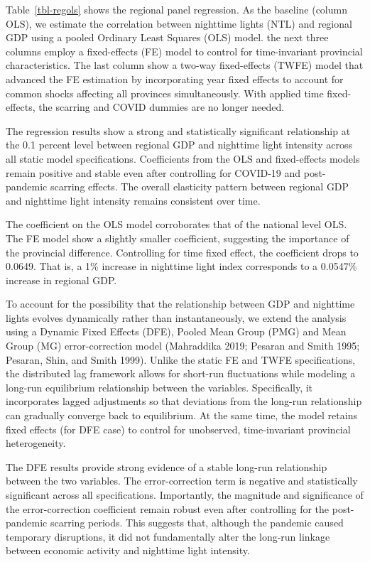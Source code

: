 \documentclass[
  manuscript=article,
  layout=publish,
  year=2026,
  volume=3,
]{den}
\begin{document}
\begin{table}
{}

\end{table}%

Table~\ref{tbl-regols} shows the regional panel regression. As the
baseline (column OLS), we estimate the correlation between nighttime
lights (NTL) and regional GDP using a pooled Ordinary Least Squares
(OLS) model. the next three columns employ a fixed-effects (FE) model to
control for time-invariant provincial characteristics. The last column
show a two-way fixed-effects (TWFE) model that advanced the FE
estimation by incorporating year fixed effects to account for common
shocks affecting all provinces simultaneously. With applied time
fixed-effects, the scarring and COVID dummies are no longer needed.

The regression results show a strong and statistically significant
relationship at the 0.1 percent level between regional GDP and nighttime
light intensity across all static model specifications. Coefficients
from the OLS and fixed-effects models remain positive and stable even
after controlling for COVID-19 and post-pandemic scarring effects. The
overall elasticity pattern between regional GDP and nighttime light
intensity remains consistent over time.

The coefficient on the OLS model corroborates that of the national level
OLS. The FE model show a slightly smaller coefficient, suggesting the
importance of the provincial difference. Controlling for time fixed
effect, the coefficient drops to 0.0649. That is, a 1\% increase in
nighttime light index corresponds to a 0.0547\% increase in regional
GDP.

To account for the possibility that the relationship between GDP and
nighttime lights evolves dynamically rather than instantaneously, we
extend the analysis using a Dynamic Fixed Effects (DFE), Pooled Mean
Group (PMG) and Mean Group (MG) error-correction model (Mahraddika 2019;
Pesaran and Smith 1995; Pesaran, Shin, and Smith 1999). Unlike the
static FE and TWFE specifications, the distributed lag framework allows
for short-run fluctuations while modeling a long-run equilibrium
relationship between the variables. Specifically, it incorporates lagged
adjustments so that deviations from the long-run relationship can
gradually converge back to equilibrium. At the same time, the model
retains fixed effects (for DFE case) to control for unobserved,
time-invariant provincial heterogeneity.

The DFE results provide strong evidence of a stable long-run
relationship between the two variables. The error-correction term is
negative and statistically significant across all specifications.
Importantly, the magnitude and significance of the error-correction
coefficient remain robust even after controlling for the post-pandemic
scarring periods. This suggests that, although the pandemic caused
temporary disruptions, it did not fundamentally alter the long-run
linkage between economic activity and nighttime light intensity.
\end{document}
